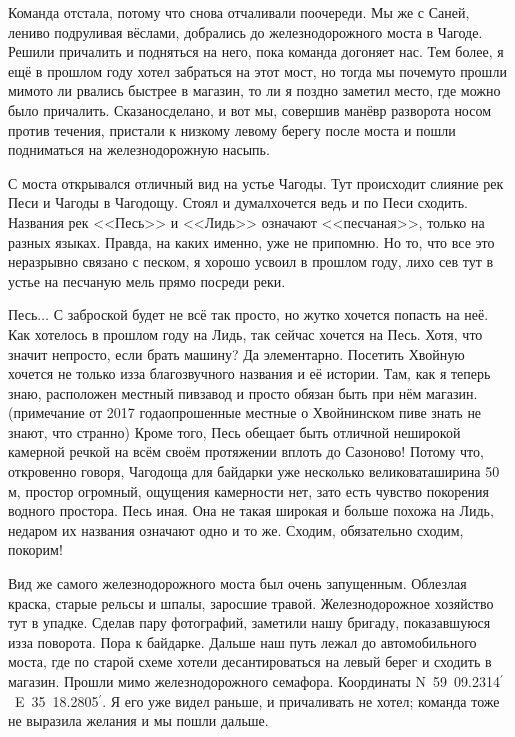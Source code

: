 Команда отстала, потому что снова отчаливали по\sdash очереди. Мы же с Саней, лениво подруливая вёслами, добрались до железнодорожного моста в Чагоде. Решили причалить и подняться на него, пока команда догоняет нас. Тем более, я ещё в прошлом году хотел забраться на этот мост, но тогда мы почему\sdash то прошли мимо\mdash то ли рвались быстрее в магазин, то ли я поздно заметил место, где можно было причалить. Сказано\mdash сделано, и вот мы, совершив манёвр разворота носом против течения, пристали к низкому левому берегу после моста и пошли подниматься на железнодорожную насыпь.

С моста открывался отличный вид на устье Чагоды. Тут происходит слияние рек Песи и Чагоды в Чагодощу. Стоял и думал\mdash хочется ведь и по Песи сходить. Названия рек <<Песь>> и <<Лидь>> означают <<песчаная>>, только на разных языках. Правда, на каких именно, уже не припомню. Но то, что все это неразрывно связано с песком, я хорошо усвоил в прошлом году, лихо сев тут в устье на песчаную мель прямо посреди реки. 

Песь$\ldots$ С заброской будет не всё так просто, но жутко хочется попасть на неё. Как хотелось в прошлом году на Лидь, так сейчас хочется на Песь. Хотя, что значит непросто, если брать машину? Да элементарно. Посетить Хвойную хочется не только из\sdash за благозвучного названия и её истории. Там, как я теперь знаю, расположен местный пивзавод и просто обязан быть при нём магазин. (примечание от 2017 года\mdash опрошенные местные о Хвойнинском пиве знать не знают, что странно) Кроме того, Песь обещает быть отличной неширокой камерной речкой на всём своём протяжении вплоть до Сазоново! Потому что, откровенно говоря, Чагодоща для байдарки уже несколько великовата\mdash ширина 50 м, простор огромный, ощущения камерности нет, зато есть чувство покорения водного простора. Песь иная. Она не такая широкая и больше похожа на Лидь, недаром их названия означают одно и то же. Сходим, обязательно сходим, покорим!

Вид же самого железнодорожного моста был очень запущенным. Облезлая краска, старые рельсы и шпалы, заросшие травой. Железнодорожное хозяйство тут в упадке. Сделав пару фотографий, заметили нашу бригаду, показавшуюся из\sdash за поворота. Пора к байдарке. Дальше наш путь лежал до автомобильного моста, где по старой схеме хотели десантироваться на левый берег и сходить в магазин. Прошли мимо железнодорожного семафора. Координаты N~59\degree~09.2314$^\prime$~E~35\degree~18.2805$^\prime$. Я его уже видел раньше, и причаливать не хотел; команда тоже не выразила желания и мы пошли дальше. 

